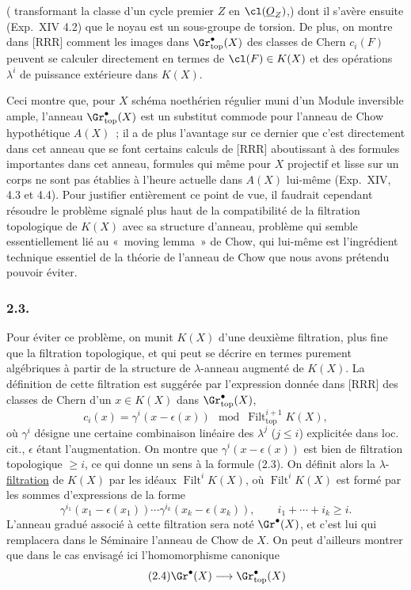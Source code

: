 (
transformant la classe d'un cycle premier $Z$ en $\cl(\underline O_Z)$,) dont il s'avère ensuite (Exp.\ XIV 4.2) que le noyau est un sous-groupe de torsion. De plus, on montre dans [RRR] comment les images dans $\Gr^{\bullet}_{\mathrm{top}}(X)$ des classes de Chern $c_i(F)$ peuvent se calculer directement en termes de $\cl(F)\in K(X)$ et des opérations $\lambda^i$ de puissance extérieure dans $K(X)$.

Ceci montre que, pour $X$ schéma noethérien régulier muni d'un Module inversible ample, l'anneau $\Gr^{\bullet}_{\mathrm{top}}(X)$ est un substitut commode pour l'anneau de Chow hypothétique $A(X)$~; il a de plus l'avantage sur ce dernier que c'est directement dans cet anneau que se font certains calculs de [RRR] aboutissant à des formules importantes dans cet anneau, formules qui même pour $X$ projectif et lisse sur un corps ne sont pas établies à l'heure actuelle dans $A(X)$ lui-même (Exp.\ XIV, 4.3 et 4.4). Pour justifier entièrement ce point de vue, il faudrait cependant résoudre le problème signalé plus haut de la compatibilité de la filtration topologique de $K(X)$ avec sa structure d'anneau, problème qui semble essentiellement lié au «~moving lemma~» de Chow, qui lui-même est l'ingrédient technique essentiel de la théorie de l'anneau de Chow que nous avons prétendu pouvoir éviter.

\subsubsection*{2.3.}
Pour éviter ce problème, on munit $K(X)$ d'une deuxième filtration, plus fine que la filtration topologique, et qui peut se décrire en termes purement algébriques à partir de la structure de $\lambda$-anneau augmenté de $K(X)$. La définition de cette filtration est suggérée par l'expression donnée dans [RRR] des classes de Chern d'un $x\in K(X)$ dans $\Gr^{\bullet}_{\mathrm{top}}(X)$,
\begin{equation}\tag{2.3}
c_i(x)=\gamma^i(x-\epsilon(x))\mod \operatorname{Filt}^{i+1}_{\mathrm{top}}K(X),
\end{equation}
où $\gamma^i$ désigne une certaine combinaison linéaire des $\lambda^j$ ($j\leq i$) explicitée dans loc. cit., $\epsilon$ étant l'augmentation. On montre que $\gamma^i(x-\epsilon(x))$ est bien de filtration topologique $\ge i$, ce qui donne un sens à la formule (2.3). On définit alors la $\lambda$-\underline{filtration} de $K(X)$ par les idéaux $\operatorname{Filt}^i K(X)$, où $\operatorname{Filt}^i K(X)$ est formé par les sommes d'expressions de la forme
\[
\gamma^{i_1}(x_1-\epsilon(x_1))\cdots \gamma^{i_k}(x_k-\epsilon(x_k)),\qquad i_1+\cdots+i_k\ge i.
\]
L'anneau gradué associé à cette filtration sera noté $\Gr^\bullet(X)$, et c'est lui qui remplacera dans le Séminaire l'anneau de Chow de $X$. On peut d'ailleurs montrer que dans le cas envisagé ici l'homomorphisme canonique
\begin{equation}\tag{2.4}
\Gr^\bullet(X)\longrightarrow \Gr^{\bullet}_{\mathrm{top}}(X)
\end{equation}
